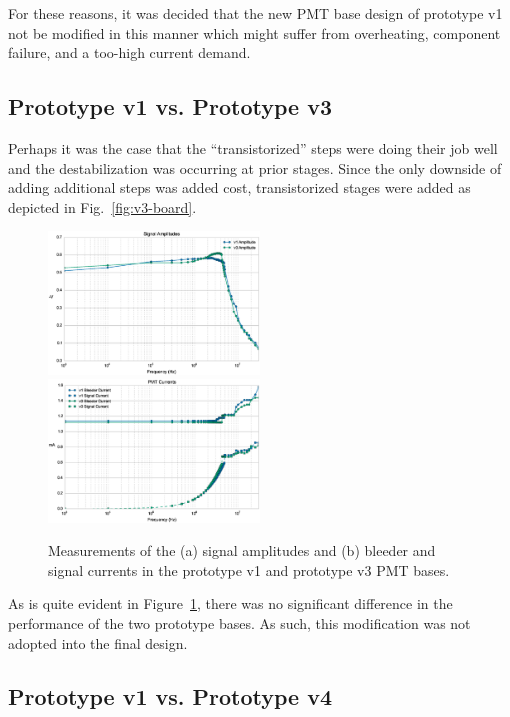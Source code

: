 For these reasons, it was decided that the new PMT base design of prototype v1 not be modified in this manner which might suffer from overheating, component failure, and a too-high current demand.

\subsection{Prototype v1 vs. Prototype v3}

Perhaps it was the case that the ``transistorized'' steps were doing their job well and the destabilization was occurring at prior stages. Since the only downside of adding additional steps was added cost, transistorized stages were added as depicted in Fig.~\ref{fig:v3-board}.

\begin{figure}[h]
	\centerline{
		\mbox{\includegraphics[width=0.5\textwidth]{figures/Test_v3_Amp.eps} \includegraphics[width=0.5\textwidth]{figures/Test_v3_Current.eps}}}
	\caption{Measurements of the (a) signal amplitudes and (b) bleeder and signal currents in the prototype v1 and prototype v3 PMT bases.}
	\label{fig:test-v3}
\end{figure}

As is quite evident in Figure~\ref{fig:test-v3}, there was no significant difference in the performance of the two prototype bases. As such, this modification was not adopted into the final design.

\subsection{Prototype v1 vs. Prototype v4}



